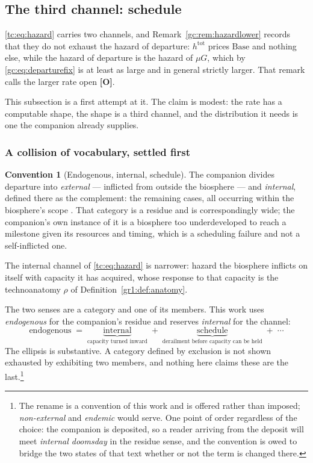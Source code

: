 \documentclass[11pt]{article}
\numberwithin{equation}{section}
\theoremstyle{plain}
\theoremstyle{definition}
\newtheorem{convention}[theorem]{Convention}
\theoremstyle{remark}
\begin{document}
\subsection{The third channel: schedule}\label{sch:sub:schedule}

\eqref{tc:eq:hazard} carries two channels, and
Remark~\ref{gc:rem:hazardlower} records that they do not exhaust the
hazard of departure: $h^{\mathrm{tot}}$ prices $\mathrm{Base}$ and
nothing else, while the hazard of departure is the hazard of $\mu G$,
which by \eqref{gc:eq:departurefix} is at least as large and in general
strictly larger. That remark calls the larger rate open \textbf{[O]}.

This subsection is a first attempt at it. The claim is modest: the rate
has a computable shape, the shape is a third channel, and the
distribution it needs is one the companion already supplies.

\subsubsection{A collision of vocabulary, settled first}
\label{sch:subsub:vocab}

\begin{convention}[Endogenous, internal, schedule]\label{sch:conv:internal}
The companion divides departure into \emph{external} --- inflicted from
outside the biosphere --- and \emph{internal}, defined there as the
complement: the remaining cases, all occurring within the biosphere's
scope \cite{Nexus}. That category is a residue and is correspondingly
wide; the companion's own instance of it is a biosphere too
underdeveloped to reach a milestone given its resources and timing,
which is a scheduling failure and not a self-inflicted one.

The internal channel of \eqref{tc:eq:hazard} is narrower: hazard the
biosphere inflicts on itself with capacity it has acquired, whose
response to that capacity is the technoanatomy $\rho$ of
Definition~\ref{gr1:def:anatomy}.

The two senses are a category and one of its members. This work uses
\emph{endogenous} for the companion's residue and reserves
\emph{internal} for the channel:
\begin{equation}\label{sch:eq:partition}
\text{endogenous}\;=\;\underbrace{\text{internal}}_{\text{capacity
turned inward}}\;+\;\underbrace{\text{schedule}}_{\text{derailment
before capacity can be held}}\;+\;\cdots
\end{equation}
The ellipsis is substantive. A category defined by exclusion is not
shown exhausted by exhibiting two members, and nothing here claims these
are the last.\footnote{The rename is a convention of this work and is
offered rather than imposed; \emph{non-external} and \emph{endemic}
would serve. One point of order regardless of the choice: the companion
is deposited, so a reader arriving from the deposit will meet
\emph{internal doomsday} in the residue sense, and the convention is
owed to bridge the two states of that text whether or not the term is
changed there.}
\end{convention}
\end{document}
